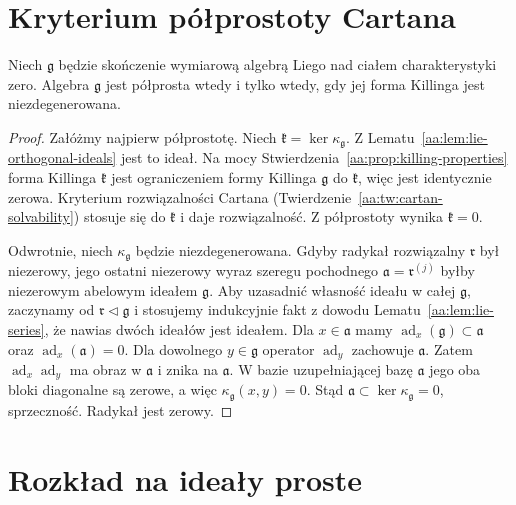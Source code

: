 \section{Kryterium półprostoty Cartana}

\begin{twierdzenie}
\label{aa:tw:cartan-semisimple}
Niech $\mathfrak g$ będzie skończenie wymiarową algebrą
Liego nad ciałem charakterystyki zero.
Algebra $\mathfrak g$ jest półprosta wtedy i tylko
wtedy, gdy jej forma Killinga jest niezdegenerowana.
\end{twierdzenie}
\begin{proof}
Załóżmy najpierw półprostotę. Niech
$\mathfrak k=\ker\kappa_{\mathfrak g}$.
Z Lematu~\ref{aa:lem:lie-orthogonal-ideals} jest to
ideał. Na mocy Stwierdzenia~\ref{aa:prop:killing-properties}
forma Killinga $\mathfrak k$ jest ograniczeniem
formy Killinga $\mathfrak g$ do $\mathfrak k$,
więc jest identycznie zerowa. Kryterium
rozwiązalności Cartana (Twierdzenie~\ref{aa:tw:cartan-solvability})
stosuje się do $\mathfrak k$ i daje rozwiązalność.
Z półprostoty wynika $\mathfrak k=0$.

Odwrotnie, niech $\kappa_{\mathfrak g}$ będzie
niezdegenerowana. Gdyby radykał rozwiązalny
$\mathfrak r$ był niezerowy, jego ostatni niezerowy
wyraz szeregu pochodnego $\mathfrak a=
\mathfrak r^{(j)}$ byłby niezerowym abelowym
ideałem $\mathfrak g$. Aby uzasadnić własność
ideału w całej $\mathfrak g$, zaczynamy od
$\mathfrak r\triangleleft\mathfrak g$ i stosujemy
indukcyjnie fakt z dowodu Lematu~\ref{aa:lem:lie-series},
że nawias dwóch ideałów jest ideałem.
Dla $x\in\mathfrak a$ mamy
$\operatorname{ad}_x(\mathfrak g)\subset\mathfrak a$
oraz $\operatorname{ad}_x(\mathfrak a)=0$.
Dla dowolnego $y\in\mathfrak g$ operator
$\operatorname{ad}_y$ zachowuje $\mathfrak a$.
Zatem $\operatorname{ad}_x\operatorname{ad}_y$
ma obraz w $\mathfrak a$ i znika na $\mathfrak a$.
W bazie uzupełniającej bazę $\mathfrak a$
jego oba bloki diagonalne są zerowe, a więc
$\kappa_{\mathfrak g}(x,y)=0$.
Stąd $\mathfrak a\subset\ker\kappa_{\mathfrak g}=0$,
sprzeczność. Radykał jest zerowy.
\end{proof}

\section{Rozkład na ideały proste}

